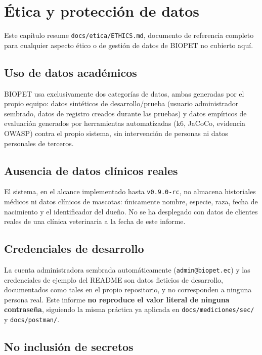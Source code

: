 \chapter{\'Etica y protecci\'on de datos}
\label{cap:etica}

Este cap\'itulo resume \texttt{docs/etica/ETHICS.md}, documento de
referencia completo para cualquier aspecto \'etico o de gesti\'on de datos
de BIOPET no cubierto aqu\'i.

\section{Uso de datos acad\'emicos}

BIOPET usa exclusivamente dos categor\'ias de datos, ambas generadas por el
propio equipo: datos sint\'eticos de desarrollo/prueba (usuario
administrador sembrado, datos de registro creados durante las pruebas) y
datos emp\'iricos de evaluaci\'on generados por herramientas automatizadas
(k6, JaCoCo, evidencia OWASP) contra el propio sistema, sin intervenci\'on
de personas ni datos personales de terceros.

\section{Ausencia de datos cl\'inicos reales}

El sistema, en el alcance implementado hasta \texttt{v0.9.0-rc}, no
almacena historiales m\'edicos ni datos cl\'inicos de mascotas: \'unicamente
nombre, especie, raza, fecha de nacimiento y el identificador del due\~no.
No se ha desplegado con datos de clientes reales de una cl\'inica
veterinaria a la fecha de este informe.

\section{Credenciales de desarrollo}

La cuenta administradora sembrada autom\'aticamente
(\texttt{admin@biopet.ec}) y las credenciales de ejemplo del README son
datos ficticios de desarrollo, documentados como tales en el propio
repositorio, y no corresponden a ninguna persona real. Este informe
\textbf{no reproduce el valor literal de ninguna contrase\~na}, siguiendo
la misma pr\'actica ya aplicada en \texttt{docs/mediciones/sec/} y
\texttt{docs/postman/}.

\section{No inclusi\'on de secretos}

